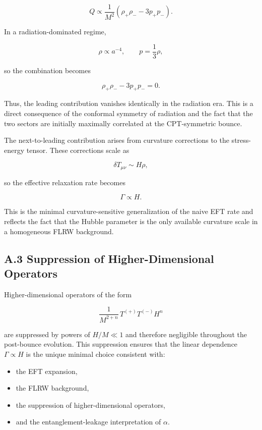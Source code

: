 \documentclass[11pt,a4paper]{article}
\begin{document}
\[
    Q \propto \frac{1}{M^2}
    (\rho_+ \rho_- - 3 p_+ p_-).
\]



In a radiation-dominated regime,


\[
    \rho \propto a^{-4},
    \qquad
    p = \frac{1}{3}\rho,
\]


so the combination becomes


\[
    \rho_+ \rho_- - 3 p_+ p_- = 0.
\]



Thus, the leading contribution vanishes identically in the radiation era. This is a direct
consequence of the conformal symmetry of radiation and the fact that the two sectors
are initially maximally correlated at the CPT-symmetric bounce.

The next-to-leading contribution arises from curvature corrections to the stress-energy
tensor. These corrections scale as


\[
    \delta T_{\mu\nu} \sim H \rho,
\]


so the effective relaxation rate becomes


\[
    \Gamma \propto H.
\]



This is the minimal curvature-sensitive generalization of the naive EFT rate and reflects
the fact that the Hubble parameter is the only available curvature scale in a homogeneous
FLRW background.

\subsection*{A.3 Suppression of Higher-Dimensional Operators}

Higher-dimensional operators of the form


\[
    \frac{1}{M^{2+n}}\,
    T^{(+)} T^{(-)} H^n
\]


are suppressed by powers of $H/M \ll 1$ and therefore negligible throughout the
post-bounce evolution. This suppression ensures that the linear dependence
$\Gamma \propto H$ is the unique minimal choice consistent with:
\begin{itemize}
    \item the EFT expansion,
    \item the FLRW background,
    \item the suppression of higher-dimensional operators,
    \item and the entanglement-leakage interpretation of $\alpha$.
\end{itemize}
\end{document}
